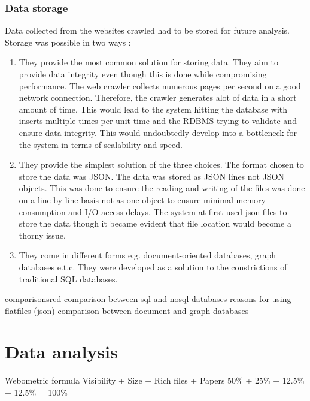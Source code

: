 \subsubsection{Data storage}
Data collected from the websites crawled had to be stored for future analysis. Storage was possible in two ways : 
\begin{enumerate}
\item {}
They provide the most common solution for storing data. They aim to provide data integrity even though this is done while compromising performance. The web crawler collects numerous pages per second on a good network connection. Therefore, the crawler generates alot of data in a short amount of time. This would lead to the system hitting the database with inserts multiple times per unit time and the RDBMS trying to validate and ensure data integrity. This would undoubtedly develop into a bottleneck for the system in terms of scalability and speed.

\item {}
They provide the simplest solution of the three choices. The format chosen to store the data was JSON. The data was stored as JSON lines not JSON objects. This was done to ensure the reading and writing of the files was done on a line by line basis not as one object to ensure minimal memory consumption and I/O access delays. The system at first used json files to store the data though it became evident that file location would become a thorny issue. 

\item {}
They come in different forms e.g. document-oriented databases, graph databases e.t.c. They were developed as a solution to the constrictions of traditional SQL databases.

\end{enumerate}
\begin{review_comment}{comparisons}{red}
{
    comparison between sql and nosql databases
    reasons for using flatfiles (json)
    comparison between document and graph databases
}
\end{review_comment}


\section{Data analysis}
Webometric formula
Visibility + Size + Rich files + Papers
50\% + 25\% + 12.5\% + 12.5\% = 100\%


